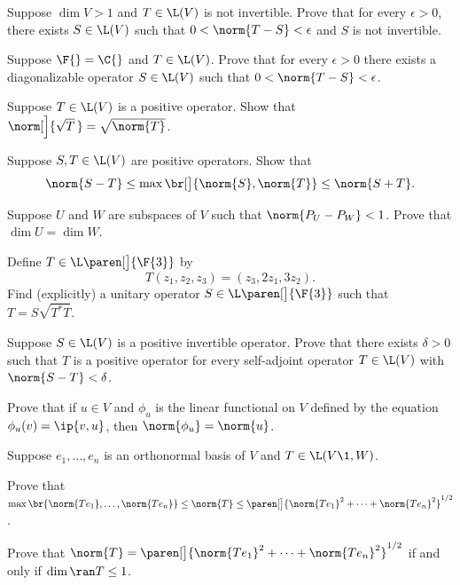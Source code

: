 \exercise
Suppose $\dim V > 1$ and $T \in \L(V)$ is not invertible. Prove that for every $\epsilon > 0$, there exists
$S \in \L(V)$ such that $0 < \norm{T - S} < \epsilon$ and $S$ is not invertible.


\exercise
Suppose $\F{} = \C{}$ and $T \in \L(V)$. Prove that for every $\epsilon > 0$ there exists a diagonalizable operator $S \in \L(V)$ such that $0 < \norm{T - S} < \epsilon$.


\exercise
Suppose $T \in \L(V)$ is a positive operator. Show that $\norm[\Big]{\sqrt{T}\,} = \sqrt{\norm{T}}$.


\exercise
Suppose $S, T \in \L(V)$ are positive operators. Show that
\[
\norm{S-T} \le \max\br[\big]{ \norm{S}, \norm{T} } \le \norm{S+T}.
\]
\exercisedisplayend


\exercise
Suppose $U$ and $W$ are subspaces of $V$ such that $\norm{P_U - P_W} < 1$. Prove that $\dim U = \dim W$.


\pagebreak[3]

\exercise
Define $T \in \L\paren[\big]{\F{3}}$ by
\[
T(z_1, z_2, z_3) = (z_3, 2z_1, 3z_2).
\]
Find (explicitly) a unitary operator $S \in \L\paren[\big]{\F{3}}$ such that $T = S \sqrt{T^*T}$.


\exercise
Suppose $S \in \L(V)$ is a positive invertible operator. Prove that there exists $\delta > 0$ such that $T$ is a positive operator for every self-adjoint operator $T \in \L(V)$ with $\norm{S-T} < \delta$.


\exercise
Prove that if $u \in V$ and $\phi_u$ is the linear functional on $V$ defined by the equation $\phi_u(v) = \ip{v, u}$, then
$\norm{\phi_u} = \norm{u}$.


\exercise
Suppose $e_1, \ldots, e_n$ is an orthonormal basis of $V$ and $T \in \L(V\1,W)$.
\begin{subtheorem}
\item
Prove that
$\max\br{ \norm{Te_1}, \ldots, \norm{Te_n} }
\le \norm{T} \le \paren[\big]{ \norm{Te_1}^2 + \cdots + \norm{Te_n}^2 }^{1/2}\!$.
\item
Prove that $\norm{T} = \paren[\big]{ \norm{Te_1}^2 + \cdots + \norm{Te_n}^2 }^{1/2}$ if and only if $\dim \ran T \le 1$.
\end{subtheorem}


